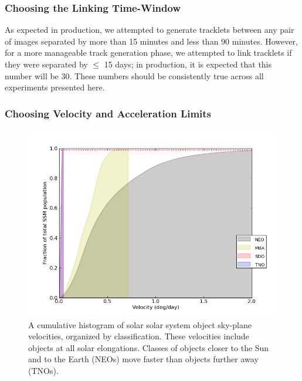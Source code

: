 \subsubsection{Choosing the Linking Time-Window}

As expected in production, we attempted to generate tracklets between
any pair of images separated by more than 15 minutes and less than
90 minutes.  However, for a more manageable track generation phase, we
attempted to link tracklets if they were separated by $\leq$ 15 days;
in production, it is expected that this number will be 30.  These
numbers should be consistently true across all experiments presented
here.


\subsubsection{Choosing Velocity and Acceleration Limits}
\label{velAccLimits}
\begin{figure}[ht!]
  \centering
  \includegraphics[width=13cm]{illustrations/mopsplots/aug2011/n_velocity.png}
  \caption[Velocity distribution of solar system objects.]{A cumulative histogram of solar solar system object
    sky-plane velocities, organized by classification.  These
    velocities include objects at all solar elongations. Classes of
    objects closer to the Sun and to the Earth (NEOs) move faster than
    objects further away (TNOs). }
  \label{velSurvey}
\end{figure}

